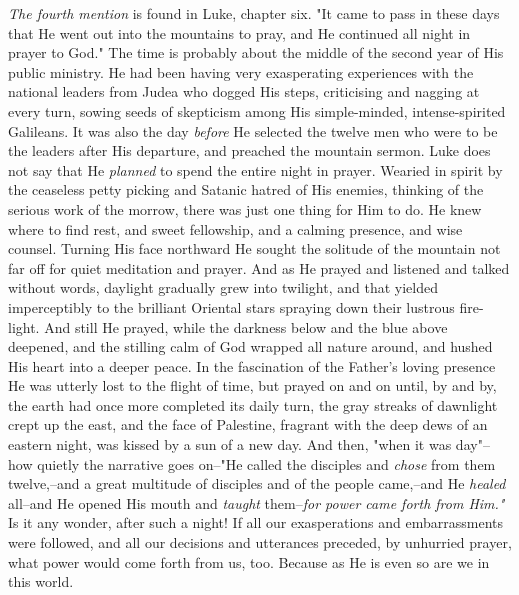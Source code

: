 \textit{The fourth mention} is found in Luke, chapter six. "It came to pass in
these days that He went out into the mountains to pray, and He continued
all night in prayer to God." The time is probably about the middle of the
second year of His public ministry. He had been having very exasperating
experiences with the national leaders from Judea who dogged His steps,
criticising and nagging at every turn, sowing seeds of skepticism among
His simple-minded, intense-spirited Galileans. It was also the day
\textit{before} He selected the twelve men who were to be the leaders after His
departure, and preached the mountain sermon. Luke does not say that He
\textit{planned} to spend the entire night in prayer. Wearied in spirit by the
ceaseless petty picking and Satanic hatred of His enemies, thinking of the
serious work of the morrow, there was just one thing for Him to do. He
knew where to find rest, and sweet fellowship, and a calming presence, and
wise counsel. Turning His face northward He sought the solitude of the
mountain not far off for quiet meditation and prayer. And as He prayed and
listened and talked without words, daylight gradually grew into twilight,
and that yielded imperceptibly to the brilliant Oriental stars spraying
down their lustrous fire-light. And still He prayed, while the darkness
below and the blue above deepened, and the stilling calm of God wrapped
all nature around, and hushed His heart into a deeper peace. In the
fascination of the Father's loving presence He was utterly lost to the
flight of time, but prayed on and on until, by and by, the earth had once
more completed its daily turn, the gray streaks of dawnlight crept up the
east, and the face of Palestine, fragrant with the deep dews of an
eastern night, was kissed by a sun of a new day. And then, "when it was
day"--how quietly the narrative goes on--"He called the disciples and
\textit{chose} from them twelve,--and a great multitude of disciples and of the
people came,--and He \textit{healed} all--and He opened His mouth and \textit{taught}
them--\textit{for power came forth from Him."} Is it any wonder, after such a
night! If all our exasperations and embarrassments were followed, and all
our decisions and utterances preceded, by unhurried prayer, what power
would come forth from us, too. Because as He is even so are we in this
world.

